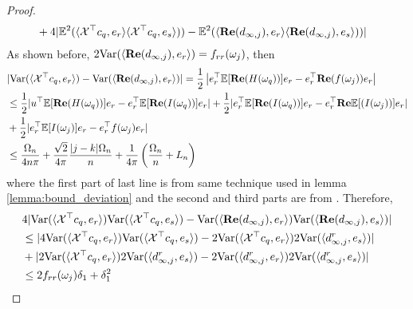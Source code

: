 \begin{proof}
\begin{equation}
\begin{aligned}
&+ 4|\mathbb{E}^2(\langle \mathcal{\mathcal{X}}^\top   c_q,e_r\rangle \langle \mathcal{\mathcal{X}}^\top  c_q,e_s\rangle) )-\mathbb{E}^2(\langle {\bf Re}(d_{\infty, j}),e_r\rangle \langle {\bf Re}(d_{\infty, j}),e_s\rangle) )|
\end{aligned}
\end{equation}
As shown before, $2\mbox{Var}(\langle {\bf Re}(d_{\infty, j}), e_r\rangle) = f_{rr}(\omega_j)$,  then 
\begin{equation}
\label{eq:help_bound1}
\begin{aligned}
&|\mbox{Var}(\langle \mathcal{X}^\top c_q,e_r\rangle) -  \mbox{Var}(\langle {\bf Re}(d_{\infty, j}),e_r\rangle)| =\frac{1}{2} \left|e_r^\top \mathbb{E}[{\bf Re}(H(\omega_q))]e_r - e_r^\top {\bf Re}(f(\omega_j))e_r\right|\\
& \le \frac{1}{2}|u^\top \mathbb{E}[{\bf Re}(H(\omega_q))]e_r - e_r^\top  \mathbb{E}[{\bf Re}(I(\omega_q))]e_r|+\frac{1}{2}|e_r^\top\mathbb{E}[{\bf Re}(I(\omega_q))]e_r-e_r^\top  {\bf Re}\mathbb{E}[(I(\omega_j))]e_r|\\
&+ \frac{1}{2}|e_r^\top\mathbb{E}[I(\omega_j)]e_r - e_r^\top  f(\omega_j)e_r|\\
&\le  \frac{\Omega_n}{4n\pi}+\frac{\sqrt{2}}{4\pi}\frac{|j-k|\Omega_n}{n}+ \frac{1}{4\pi}\left(\frac{\Omega_n}{n} + L_n\right)\\
\end{aligned}
\end{equation}
where the first part of last line is from same technique used in lemma \ref{lemma:bound_deviation} and the second and third parts are from \cite{sun2018large}. 
Therefore, 
\begin{equation}
\begin{aligned}
&4|\mbox{Var}(\langle \mathcal{X}^\top  c_q,e_r\rangle)\mbox{Var}({\langle \mathcal{X}^\top   c_q,e_s\rangle)} - \mbox{Var}(\langle {\bf Re}(d_{\infty, j}) ,e_r\rangle)\mbox{Var}(\langle {\bf Re}(d_{\infty, j}), e_s\rangle)| \\
& \le |4\mbox{Var}(\langle \mathcal{X}^\top c_q,e_r\rangle)\mbox{Var}(\langle \mathcal{X}^\top  c_q,e_s\rangle)- 2\mbox{Var}(\langle \mathcal{X}^\top  c_q,e_r\rangle)2\mbox{Var}(\langle d^{r}_{\infty, j},e_s\rangle)| \\
&+|2\mbox{Var}(\langle \mathcal{X}^\top  c_q,e_r\rangle)2\mbox{Var}(\langle d^{r}_{\infty, j},e_s\rangle)- 2\mbox{Var}(\langle d^{r}_{\infty, j},e_r\rangle)2\mbox{Var}(\langle d^{r}_{\infty, j},e_s\rangle)|\\
&\le 2f_{rr}(\omega_j) \delta_1+\delta_1^2
\end{aligned}
\end{equation}

\end{proof}
